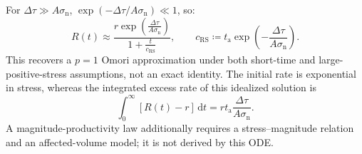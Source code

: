 For $\Delta\tau \gg A\sigma_{\mathrm{n}}$,
$\exp(-\Delta\tau/A\sigma_{\mathrm{n}}) \ll 1$, so:
\begin{equation}
  R(t) \approx \frac{r
  \exp\left(\frac{\Delta\tau}{A\sigma_{\mathrm{n}}}\right)}{1 +
  \frac{t}{c_{\mathrm{RS}}}}, \qquad
  c_{\mathrm{RS}} \coloneqq t_{\mathrm{a}}
  \exp\left(-\frac{\Delta\tau}{A\sigma_{\mathrm{n}}}\right).
\end{equation}
This recovers a $p=1$ Omori approximation under both short-time and
large-positive-stress assumptions, not an exact identity. The initial
rate is exponential in stress, whereas the integrated excess rate of
this idealized solution is
\begin{equation}
  \int_0^\infty[R(t)-r]\,\mathrm{d}t
  =rt_{\mathrm a}\frac{\Delta\tau}{A\sigma_{\mathrm n}}.
\end{equation}
A magnitude-productivity law additionally requires a stress--magnitude
relation and an affected-volume model; it is not derived by this ODE.

